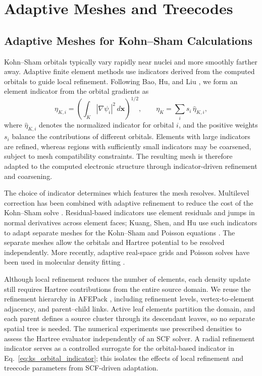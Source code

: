 \documentclass[a4paper,pdflatex,sn-mathphys-num]{sn-jnl}
\theoremstyle{thmstyleone}
\begin{document}
\section{Adaptive Meshes and Treecodes}
\label{sec:adaptive_meshes_treecodes}
\subsection{Adaptive Meshes for Kohn--Sham Calculations}
\label{subsec:adaptive_mesh}

Kohn--Sham orbitals typically vary rapidly near nuclei and more smoothly farther away. Adaptive finite element methods use indicators derived from the computed orbitals to guide local refinement. Following Bao, Hu, and Liu \cite{BaoHuLiu2012}, we form an element indicator from the orbital gradients as
\begin{equation}
\eta_{K,i}=\left(\int_K|\nabla\psi_i|^2\,d\mathbf x\right)^{1/2},
\qquad
\eta_K=\sum_i s_i\,\widehat{\eta}_{K,i},
\label{eq:ks_orbital_indicator}
\end{equation}
where \(\widehat{\eta}_{K,i}\) denotes the normalized indicator for orbital \(i\), and the positive weights \(s_i\) balance the contributions of different orbitals. Elements with large indicators are refined, whereas regions with sufficiently small indicators may be coarsened, subject to mesh compatibility constraints. The resulting mesh is therefore adapted to the computed electronic structure through indicator-driven refinement and coarsening.

The choice of indicator determines which features the mesh resolves. Multilevel correction has been combined with adaptive refinement to reduce the cost of the Kohn--Sham solve \cite{HuXieXu2018}. Residual-based indicators use element residuals and jumps in normal derivatives across element faces; Kuang, Shen, and Hu use such indicators to adapt separate meshes for the Kohn--Sham and Poisson equations \cite{Kuang2024}. The separate meshes allow the orbitals and Hartree potential to be resolved independently. More recently, adaptive real-space grids and Poisson solves have been used in molecular density fitting \cite{Zhu2026}.

Although local refinement reduces the number of elements, each density update still requires Hartree contributions from the entire source domain. We reuse the refinement hierarchy in AFEPack \cite{AFEPack}, including refinement levels, vertex-to-element adjacency, and parent--child links. Active leaf elements partition the domain, and each parent defines a source cluster through its descendant leaves, so no separate spatial tree is needed. The numerical experiments use prescribed densities to assess the Hartree evaluator independently of an SCF solver. A radial refinement indicator serves as a controlled surrogate for the orbital-based indicator in Eq.~\eqref{eq:ks_orbital_indicator}; this isolates the effects of local refinement and treecode parameters from SCF-driven adaptation.
\end{document}
